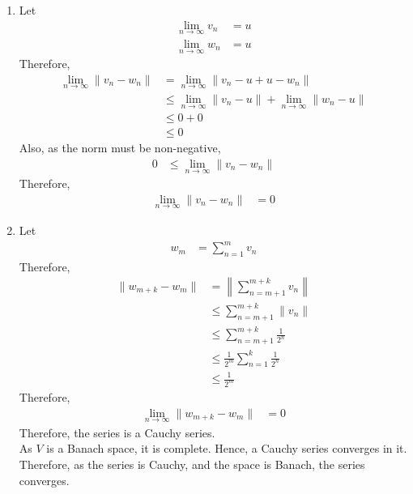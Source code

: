 \documentclass[fleqn, a4paper, 12pt, twoside]{article}
\theoremstyle{definition}
\theoremstyle{theorem}
\begin{document}
\begin{solution}
	\begin{enumerate}[leftmargin=*]
		\item
			Let
			\begin{align*}
				\lim\limits_{n \to \infty} v_n & = u \\
				\lim\limits_{n \to \infty} w_n & = u
			\end{align*}
			Therefore,
			\begin{align*}
				\lim\limits_{n \to \infty} \|v_n - w_n\| & = \lim\limits_{n \to \infty} \|v_n - u + u - w_n\|                                  \\
                                                                         & \le \lim\limits_{n \to \infty} \|v_n - u\| + \lim\limits_{n \to \infty} \|w_n - u\| \\
                                                                         & \le 0 + 0                                                                           \\
                                                                         & \le 0
			\end{align*}
			Also, as the norm must be non-negative,
			\begin{align*}
				0 & \le \lim\limits_{n \to \infty} \|v_n - w_n\|
			\end{align*}
			Therefore,
			\begin{align*}
				\lim\limits_{n \to \infty} \|v_n - w_n\| & = 0
			\end{align*}
		\item
			Let
			\begin{align*}
				w_m & = \sum\limits_{n = 1}^{m} v_n
			\end{align*}
			Therefore,
			\begin{align*}
				\|w_{m + k} - w_m\| & = \left\| \sum\limits_{n = m + 1}^{m + k} v_n \right\|  \\
                                                    & \le \sum\limits_{n = m + 1}^{m + k} \|v_n\|             \\
                                                    & \le \sum\limits_{n = m + 1}^{m + k} \frac{1}{2^n}       \\
                                                    & \le \frac{1}{2^m} \sum\limits_{n = 1}^{k} \frac{1}{2^n} \\
                                                    & \le \frac{1}{2^m}
       		\end{align*}
			Therefore,
			\begin{align*}
				\lim\limits_{n \to \infty} \|w_{m + k} - w_m\| & = 0
			\end{align*}
			Therefore, the series is a Cauchy series.\\
			As $V$ is a Banach space, it is complete.
			Hence, a Cauchy series converges in it.\\
			Therefore, as the series is Cauchy, and the space is Banach, the series converges.
	\end{enumerate}
\end{solution}
\end{document}
